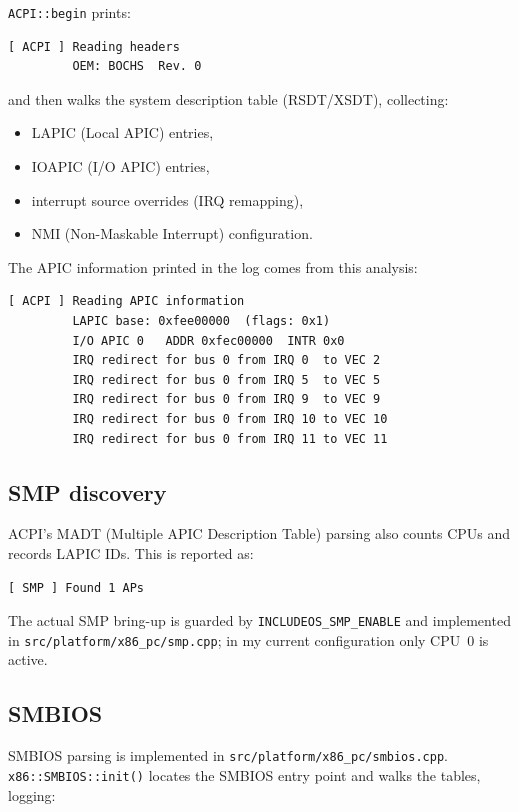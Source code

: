 \documentclass[a4paper,11pt]{article}
\begin{document}
\texttt{ACPI::begin} prints:

\begin{verbatim}
[ ACPI ] Reading headers
         OEM: BOCHS  Rev. 0
\end{verbatim}

and then walks the system description table (RSDT/XSDT), collecting:

\begin{itemize}
  \item LAPIC (Local APIC) entries,
  \item IOAPIC (I/O APIC) entries,
  \item interrupt source overrides (IRQ remapping),
  \item NMI (Non-Maskable Interrupt) configuration.
\end{itemize}

The APIC information printed in the log comes from this analysis:

\begin{verbatim}
[ ACPI ] Reading APIC information
         LAPIC base: 0xfee00000  (flags: 0x1)
         I/O APIC 0   ADDR 0xfec00000  INTR 0x0
         IRQ redirect for bus 0 from IRQ 0  to VEC 2
         IRQ redirect for bus 0 from IRQ 5  to VEC 5
         IRQ redirect for bus 0 from IRQ 9  to VEC 9
         IRQ redirect for bus 0 from IRQ 10 to VEC 10
         IRQ redirect for bus 0 from IRQ 11 to VEC 11
\end{verbatim}

\subsection{SMP discovery}

ACPI’s MADT (Multiple APIC Description Table) parsing also counts CPUs
and records LAPIC IDs. This is reported as:

\begin{verbatim}
[ SMP ] Found 1 APs
\end{verbatim}

The actual SMP bring-up is guarded by \texttt{INCLUDEOS\_SMP\_ENABLE}
and implemented in \texttt{src/platform/x86\_pc/smp.cpp}; in my current
configuration only CPU~0 is active.

\subsection{SMBIOS}

SMBIOS parsing is implemented in
\texttt{src/platform/x86\_pc/smbios.cpp}. \texttt{x86::SMBIOS::init()}
locates the SMBIOS entry point and walks the tables, logging:
\end{document}
